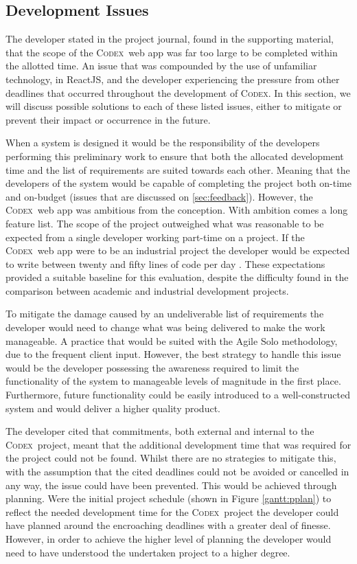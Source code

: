 \documentclass[final]{cmpreport}
\newcommand{\Codex}{\textsc{Codex}}
\begin{document}
		\subsection{Development Issues} \label{sec:dev-eval}
		The developer stated in the project journal, found in the supporting material, that the scope of the \Codex \ web app was far too large to be completed within the allotted time. An issue that was compounded by the use of unfamiliar technology, in ReactJS, and the developer experiencing the pressure from other deadlines that occurred throughout the development of \Codex. In this section, we will discuss possible solutions to each of these listed issues, either to mitigate or prevent their impact or occurrence in the future. 
		
		When a system is designed it would be the responsibility of the developers performing this preliminary work to ensure that both the allocated development time and the list of requirements are suited towards each other. Meaning that the developers of the system would be capable of completing the project both on-time and on-budget (issues that are discussed on \ref{sec:feedback}). However, the \Codex \ web app was ambitious from the conception. With ambition comes a long feature list. The scope of the project outweighed what was reasonable to be expected from a single developer working part-time on a project. If the \Codex \ web app were to be an industrial project the developer would be expected to write between twenty and fifty lines of code per day \citep{dev-metrics}. These expectations provided a suitable baseline for this evaluation, despite the difficulty found in the comparison between academic and industrial development projects.
		
		To mitigate the damage caused by an undeliverable list of requirements the developer would need to change what was being delivered to make the work manageable. A practice that would be suited with the Agile Solo methodology, due to the frequent client input. However, the best strategy to handle this issue would be the developer possessing the awareness required to limit the functionality of the system to manageable levels of magnitude in the first place. Furthermore, future functionality could be easily introduced to a well-constructed system and would deliver a higher quality product.
		
		The developer cited that commitments, both external and internal to the \Codex \ project, meant that the additional development time that was required for the project could not be found. Whilst there are no strategies to mitigate this, with the assumption that the cited deadlines could not be avoided or cancelled in any way, the issue could have been prevented. This would be achieved through planning. Were the initial project schedule (shown in Figure \ref{gantt:pplan}) to reflect the needed development time for the \Codex \ project the developer could have planned around the encroaching deadlines with a greater deal of finesse. However, in order to achieve the higher level of planning the developer would need to have understood the undertaken project to a higher degree. 
		
\end{document}
